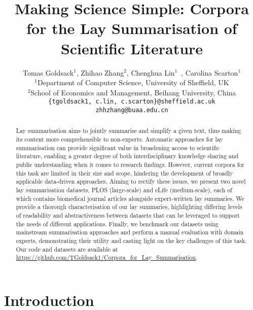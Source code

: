 \documentclass[11pt]{article}
\title{Making Science Simple: Corpora for the Lay Summarisation of Scientific Literature}
\author{Tomas Goldsack$^{1}$, Zhihao Zhang$^{2}$, Chenghua Lin$^{1}$\footnotemark[1]~, Carolina Scarton$^{1}$ \\
        $^{1}$Department of Computer Science, University of Sheffield, UK \\ 
        $^{2}$School of Economics and Management, Beihang University, China\\
\texttt{\{tgoldsack1, c.lin, c.scarton\}@sheffield.ac.uk}\\
\texttt{zhhzhang@buaa.edu.cn}}
\begin{document}
\maketitle


\begin{abstract}




Lay summarisation aims to jointly summarise and simplify a given text, thus making its content more comprehensible to non-experts.
Automatic approaches for lay summarisation can provide significant value in broadening access to scientific literature, enabling a greater degree of both interdisciplinary knowledge sharing and public understanding when it comes to research findings. However, current corpora for this task are limited in their size and scope, hindering the development of broadly applicable data-driven approaches. 
Aiming to rectify these issues, we present two novel lay summarisation datasets, PLOS (large-scale) and eLife (medium-scale), each of which contains biomedical journal articles alongside expert-written lay summaries.
We provide a thorough characterisation of our lay summaries, 
highlighting differing levels of readability and abstractiveness
between datasets that can be leveraged to support the needs of different applications.
Finally, we benchmark our datasets using mainstream summarisation approaches and perform a manual evaluation with domain experts, demonstrating their utility and casting light on the key challenges of this task. 
Our code and datasets are available at \url{https://github.com/TGoldsack1/Corpora_for_Lay_Summarisation}.
\end{abstract}
 \section{Introduction}
\end{document}
